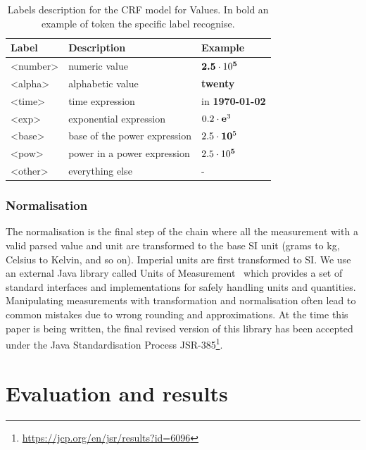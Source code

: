 \documentclass[sigconf]{acmart}
\begin{document}
\begin{table}[ht]
  \caption{Labels description for the CRF model for Values. In bold an example of token the specific label recognise.}
  \label{tab:values-model-labels}
  \begin{tabular}{lll}
    \toprule
    Label & Description & Example\\
    \midrule
    <number> & numeric value & $\textbf{2.5}\cdot10\textsuperscript{\textbf{5}}$ \\
    <alpha> & alphabetic value & \textbf{twenty} \\
    <time> & time expression  & in \textbf{1970-01-02}\\
    <exp> & exponential expression & $0.2\cdot\textbf{e}\textsuperscript{3}$ \\
    <base> & base of the power expression & $2.5\cdot\textbf{10}\textsuperscript{5}$\\
    <pow> & power in a power expression & $2.5\cdot10\textsuperscript{\textbf{5}}$ \\
    <other> & everything else & - \\
  \bottomrule
\end{tabular}
\end{table}

\subsubsection{Normalisation}

The normalisation is the final step of the chain where all the measurement with a valid parsed value and unit are transformed to the base SI unit (grams to kg, Celsius to Kelvin, and so on). Imperial units are first transformed to SI. We use an external Java library called Units of Measurement~\cite{units_of_measurement} which provides a set of standard interfaces and implementations for safely handling units and quantities. Manipulating measurements with transformation and normalisation often lead to common mistakes due to wrong rounding and approximations. At the time this paper is being written, the final revised version of this library has been accepted under the Java Standardisation Process JSR-385\footnote{\url{https://jcp.org/en/jsr/results?id=6096}}. 

\section{Evaluation and results}
\label{sec:results}
\end{document}
